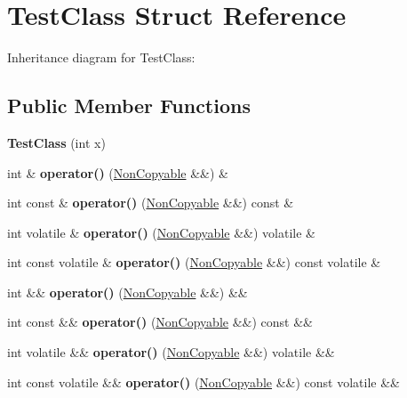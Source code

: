 \hypertarget{struct_test_class}{}\section{Test\+Class Struct Reference}
\label{struct_test_class}


Inheritance diagram for Test\+Class\+:
\subsection*{Public Member Functions}
\begin{DoxyCompactItemize}
\item 
\mbox{\label{struct_test_class_a36518516da3c4a0d65d3832cdb01d288}} 
{\bfseries Test\+Class} (int x)
\item 
\mbox{\label{struct_test_class_a851f8b9ea6d794a32969caa9111b023e}} 
int \& {\bfseries operator()} (\mbox{\hyperlink{struct_non_copyable}{Non\+Copyable}} \&\&) \&
\item 
\mbox{\label{struct_test_class_a92ac06bf2a0b79cff8fcce7ab823826c}} 
int const  \& {\bfseries operator()} (\mbox{\hyperlink{struct_non_copyable}{Non\+Copyable}} \&\&) const \&
\item 
\mbox{\label{struct_test_class_a9b0437385b1d223bd2c8b8dc1c652967}} 
int volatile \& {\bfseries operator()} (\mbox{\hyperlink{struct_non_copyable}{Non\+Copyable}} \&\&) volatile \&
\item 
\mbox{\label{struct_test_class_a22183cbb9d1b165f8cb38b60adc868cb}} 
int const volatile \& {\bfseries operator()} (\mbox{\hyperlink{struct_non_copyable}{Non\+Copyable}} \&\&) const volatile \&
\item 
\mbox{\label{struct_test_class_a5454c31933083d679498ba531eb88498}} 
int \&\& {\bfseries operator()} (\mbox{\hyperlink{struct_non_copyable}{Non\+Copyable}} \&\&) \&\&
\item 
\mbox{\label{struct_test_class_a29aa5e582495f99f738d84e6f3f37982}} 
int const  \&\& {\bfseries operator()} (\mbox{\hyperlink{struct_non_copyable}{Non\+Copyable}} \&\&) const \&\&
\item 
\mbox{\label{struct_test_class_a999e9b0f3bbc8ca5cd678dffdaf3640a}} 
int volatile \&\& {\bfseries operator()} (\mbox{\hyperlink{struct_non_copyable}{Non\+Copyable}} \&\&) volatile \&\&
\item 
\mbox{\label{struct_test_class_adb80fb82e167dea7b19cd47c9bf5eb16}} 
int const volatile \&\& {\bfseries operator()} (\mbox{\hyperlink{struct_non_copyable}{Non\+Copyable}} \&\&) const volatile \&\&
\end{DoxyCompactItemize}
